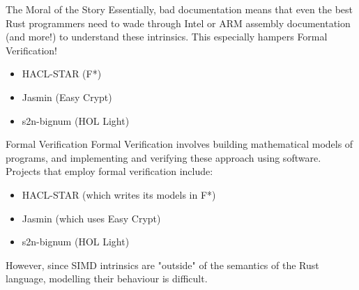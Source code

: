 \documentclass[presentation]{beamer}
\begin{document}
\begin{frame}[label={sec:orgbef1199}]{The Moral of the Story}
Essentially, bad documentation means that even the best Rust programmers need to wade through Intel or ARM assembly documentation (and more!) to understand these intrinsics. \pause This especially hampers \alert{Formal Verification!}
\begin{itemize}
\item HACL-STAR (F*)
\item Jasmin (Easy Crypt)
\item s2n-bignum (HOL Light)
\end{itemize}
\end{frame}
\begin{frame}[label={sec:orgd90749b}]{Formal Verification}
Formal Verification involves building mathematical models of programs, and implementing and verifying these approach using software. \pause Projects that employ formal verification include:
\begin{itemize}
\item HACL-STAR (which writes its models in F*)
\item Jasmin (which uses Easy Crypt)
\item s2n-bignum (HOL Light)
\end{itemize}
\pause However, since SIMD intrinsics are "outside" of the semantics of the Rust language, modelling their behaviour is difficult.
\end{frame}
\end{document}
